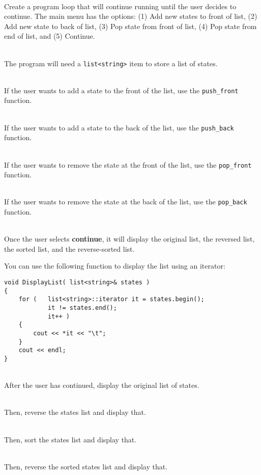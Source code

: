        ~\\ Create a program loop that will continue running until the user decides to continue.
        The main menu has the options: (1) Add new states to front of list, (2) Add new state to back of list,
        (3) Pop state from front of list, (4) Pop state from end of list, and (5) Continue.

        ~\\ The program will need a \texttt{list<string>} item to store a list of states.

        ~\\ If the user wants to add a state to the front of the list, use the \texttt{push\_front} function.
        
        ~\\ If the user wants to add a state to the back of the list, use the \texttt{push\_back} function.
        
        ~\\ If the user wants to remove the state at the front of the list, use the \texttt{pop\_front} function.
        
        ~\\ If the user wants to remove the state at the back of the list, use the \texttt{pop\_back} function.

        ~\\ Once the user selects \textbf{continue}, it will display the original list, the reversed list,
        the sorted list, and the reverse-sorted list.

        \newpage
        You can use the following function to display the list using an iterator:

\begin{lstlisting}[style=code]
void DisplayList( list<string>& states )
{
    for (   list<string>::iterator it = states.begin();
            it != states.end();
            it++ )
    {
        cout << *it << "\t";
    }
    cout << endl;
}
\end{lstlisting}

        ~\\ After the user has continued, display the original list of states.

        ~\\ Then, reverse the states list and display that.
        
        ~\\ Then, sort the states list and display that.
        
        ~\\ Then, reverse the sorted states list and display that.

